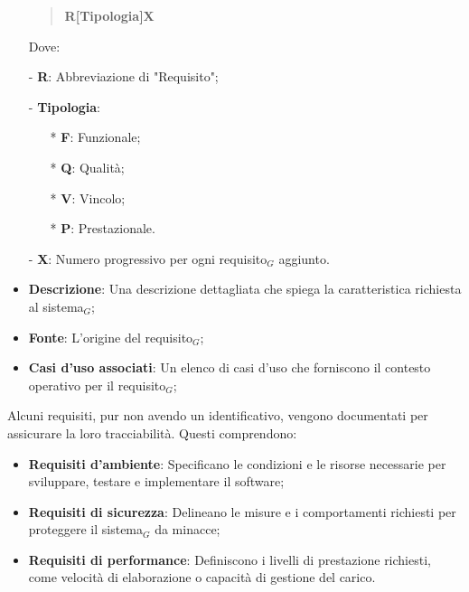 \documentclass[10pt]{article}
\begin{document}
\begin{justify}
\begin{itemize}
\begin{quote}
                \textbf{R[{Tipologia}]X}
            \end{quote}
            Dove:
            \item [-] \textbf{R}: Abbreviazione di "Requisito";
            \item [-] \textbf{Tipologia}:
            \begin{itemize}
                \item [*] \textbf{F}: Funzionale;
                \item [*] \textbf{Q}: Qualità;
                \item [*] \textbf{V}: Vincolo;
                \item [*] \textbf{P}: Prestazionale.
            \end{itemize}
            \item [-] \textbf{X}: Numero progressivo per ogni requisito$_G$ aggiunto.
            \item \textbf{Descrizione}: Una descrizione dettagliata che spiega la caratteristica richiesta al sistema$_G$;
            \item \textbf{Fonte}: L'origine del requisito$_G$;
            \item \textbf{Casi d'uso associati}: Un elenco di casi d'uso che forniscono il contesto operativo per il requisito$_G$;
        \end{itemize}
        Alcuni requisiti, pur non avendo un identificativo, vengono documentati per assicurare la loro tracciabilità. Questi comprendono:
        \begin{itemize}
            \item \textbf{Requisiti d'ambiente}: Specificano le condizioni e le risorse necessarie per sviluppare, testare e implementare il software;
            \item \textbf{Requisiti di sicurezza}: Delineano le misure e i comportamenti richiesti per proteggere il sistema$_G$ da minacce;
            \item \textbf{Requisiti di performance}: Definiscono i livelli di prestazione richiesti, come velocità di elaborazione o capacità di gestione del carico.
        \end{itemize}


\end{justify}
\end{document}

